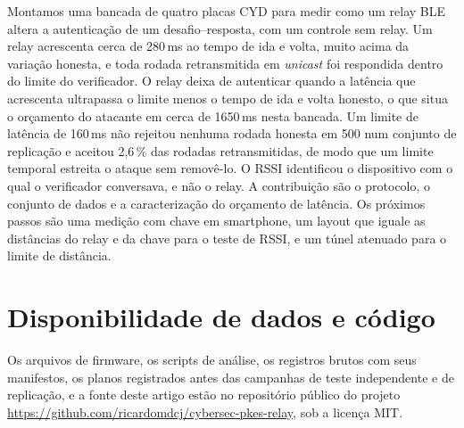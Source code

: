 \documentclass{ieeeaccess}
\begin{document}
Montamos uma bancada de quatro placas CYD para medir como um relay BLE altera a autenticação de um desafio--resposta, com um controle sem relay. Um relay acrescenta cerca de 280\,ms ao tempo de ida e volta, muito acima da variação honesta, e toda rodada retransmitida em \emph{unicast} foi respondida dentro do limite do verificador. O relay deixa de autenticar quando a latência que acrescenta ultrapassa o limite menos o tempo de ida e volta honesto, o que situa o orçamento do atacante em cerca de 1650\,ms nesta bancada. Um limite de latência de 160\,ms não rejeitou nenhuma rodada honesta em 500 num conjunto de replicação e aceitou 2,6\,\% das rodadas retransmitidas, de modo que um limite temporal estreita o ataque sem removê-lo. O RSSI identificou o dispositivo com o qual o verificador conversava, e não o relay. A contribuição são o protocolo, o conjunto de dados e a caracterização do orçamento de latência. Os próximos passos são uma medição com chave em smartphone, um layout que iguale as distâncias do relay e da chave para o teste de RSSI, e um túnel atenuado para o limite de distância.

\section*{Disponibilidade de dados e código}

Os arquivos de firmware, os scripts de análise, os registros brutos com seus manifestos, os planos registrados antes das campanhas de teste independente e de replicação, e a fonte deste artigo estão no repositório público do projeto \url{https://github.com/ricardomdcj/cybersec-pkes-relay}, sob a licença MIT.
\end{document}

